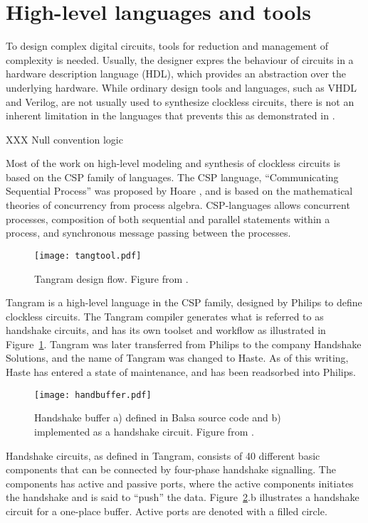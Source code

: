 \section{High-level languages and tools}
\label{sec:tools}

To design complex digital circuits, tools for reduction and management
of complexity is needed. Usually, the designer expres the behaviour of
circuits in a hardware description language (HDL), which provides an
abstraction over the underlying hardware. While ordinary design tools
and languages, such as VHDL and Verilog, are not usually used to
synthesize clockless circuits, there is not an inherent limitation in
the languages that prevents this as demonstrated in
\cite[pp. 135-137]{sparso}.

XXX Null convention logic

Most of the work on high-level modeling and synthesis of clockless
circuits is based on the CSP family of languages. The CSP language,
``Communicating Sequential Process'' was proposed by Hoare \cite{csp},
and is based on the mathematical theories of concurrency from process
algebra. CSP-languages allows concurrent processes, composition of
both sequential and parallel statements within a process, and
synchronous message passing between the processes.

\begin{figure}[htbp]
  \centering
  \texttt{[image: tangtool.pdf]}
  \caption{Tangram design flow. Figure from \cite{fullscan}.}
  \label{fig:tangtool}
\end{figure}

Tangram is a high-level language in the CSP family, designed by
Philips to define clockless circuits. The Tangram compiler generates
what is referred to as handshake circuits, and has its own toolset and
workflow as illustrated in Figure~\ref{fig:tangtool}. Tangram was
later transferred from Philips to the company Handshake Solutions, and
the name of Tangram was changed to Haste. As of this writing, Haste
has entered a state of maintenance, and has been readsorbed into
Philips.

\begin{figure}[htbp]
  \centering
  \texttt{[image: handbuffer.pdf]}
  \caption{Handshake buffer a) defined in Balsa source code and b)
    implemented as a handshake circuit. Figure from
    \cite{taylor2008automatic}.}
  \label{fig:handbuffer}
\end{figure}

Handshake circuits, as defined in Tangram, consists of 40 different
basic components that can be connected by four-phase handshake
signalling. The components has active and passive ports, where the
active components initiates the handshake and is said to ``push'' the
data. Figure~\ref{fig:handbuffer}.b illustrates a handshake circuit for
a one-place buffer. Active ports are denoted with a filled circle.

